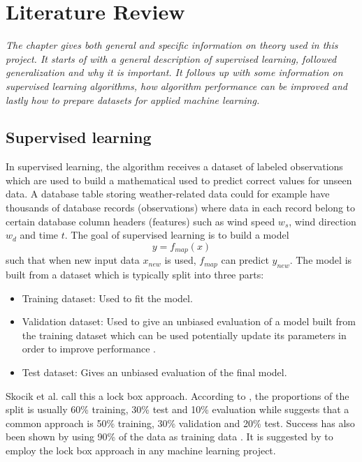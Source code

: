 \chapter{Literature Review} \label {ch:theory}
\emph{The chapter gives both general and specific information on theory used in this project. It starts of with a general description of supervised learning, followed generalization and why it is important. It follows up with some information on supervised learning algorithms, how algorithm performance can be improved and lastly how to prepare datasets for applied machine learning.}


\section{Supervised learning} \label{sec:supervisedlearning}
	In supervised learning, the algorithm receives a dataset of labeled observations which are used to build a mathematical used to predict correct values for unseen data. A database table storing weather-related data could for example have thousands of database records (observations) where data in each record belong to certain database column headers (features) such as wind speed $w_s$, wind direction $w_d$ and time $t$. The goal of supervised learning is to build a model
\begin{equation} \label{eq:mappingfunction}
	y = f_{map}(x)
\end{equation}
such that when new input data $x_{new}$ is used, $f_{map}$ can predict $y_{new}$. The model is built from a dataset which is typically split into three parts:

\begin{itemize}
	\item {Training dataset:} Used to fit the model.
	\item {Validation dataset:} Used to give an unbiased evaluation of a model built from the training dataset which can be used potentially update its parameters in order to improve performance \cite{BOOK:6}.  %
	\item {Test dataset:} Gives an unbiased evaluation of the final model.
\end{itemize}
	Skocik et al. \cite{ARTICLE:20} call this a lock box approach. According to \cite{BOOK:6}, the proportions of the split is usually 60\% training, 30\% test and 10\% evaluation while \cite{ARTICLE:4} suggests that a common approach is 50\% training, 30\% validation and 20\% test. Success has also been shown by using 90\% of the data as training data \cite{ARTICLE:19}. It is suggested by \cite{ARTICLE:4} to employ the lock box approach in any machine learning project. 

